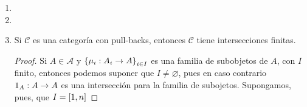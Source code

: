 \documentclass{article}
\begin{document}
\begin{enumerate}[label=\textbf{Ej \arabic*.}]
\begin{proof}
\begin{align*}
			\end{align*}
			Ahora, si $P\in Mod\lrprth{R}$ y $\catarrow{\beta_1}{P}{A_1},\catarrow{\beta_2}{P}{A_2}$ son morfismos de $R$-módulos tales que $\alpha_1\beta_1=\alpha_2\beta_2$, entonces sea
			\begin{align*}
				\descapp{\gamma}{P}{\copyandpaste}{p}{\lrprth{\beta_1\lrprth{p},\beta_2\lrprth{p}}}{.}
			\end{align*}
			Notemos que $\gamma$ es un morfismo de $R$-módulos, puesto que $\beta_1$ y $\beta_2$ lo son, y que si $p\in P$ entonces
			\begin{align*}
				\pi_1\gamma\lrprth{p}&=\pi_1\lrprth{\beta_1\lrprth{p},\beta_2\lrprth{p}}=\beta_1\lrprth{p}\\
				\implies \pi_1\gamma&=\beta_1.
			\end{align*}
			Análogamente se verifica que $\pi_2\gamma=\beta_2$, con lo cual el siguiente diagrama conmuta
			\begin{equation*}
				\commutativesquare{up=t,A=\copyandpaste,B=A_2,C=A_1,D=A,f=\pi_2,g=\pi_1,h=\alpha_2,k=\alpha_1,l=\beta_2,m=\beta_1,n=\gamma,}
			\end{equation*}
			Finalmente, si $\catarrow{\gamma'}{P}{\copyandpaste}$ es un morfismo de $R$-módulos tal que $\pi_1\gamma'=\beta_1$ y $\pi_2\gamma'=\beta_2$ y $p\in P$, entonces
			\begin{align*}
				\pi_1\gamma'\lrprth{p}&=\beta_1\lrprth{p},\\
				\pi_2\gamma'\lrprth{p}&=\beta_2\lrprth{p},
			\end{align*}
			con lo cual $\gamma'\lrprth{p}=\lrprth{\pi_1\lrprth{\gamma'\lrprth{p}},\pi_2\lrprth{\gamma'\lrprth{p}}}=\lrprth{\beta_1\lrprth{p},\beta_2\lrprth{p}}=\gamma\lrprth{p}$ y por lo tanto $\gamma'=\gamma$.\\
		\end{proof}
		\item 
		\item
		\item Si $\mathscr{C}$ es una categoría con pull-backs, entonces $\mathscr{C}$ tiene intersecciones finitas.
		\begin{proof}
			Si $A\in\mathscr{A}$ y $\left\{\mu_i:A_i\to A\right\}_{i\in I}$ es una familia de subobjetos de $A$, con $I$ finito, entonces podemos suponer que $I\neq\varnothing$, pues en caso contrario $1_A:A\to A$ es una intersección para la familia de subojetos. Supongamos, pues, que $I=\left[1,n\right]$
		\end{proof}
	\end{enumerate}	
\end{document}
